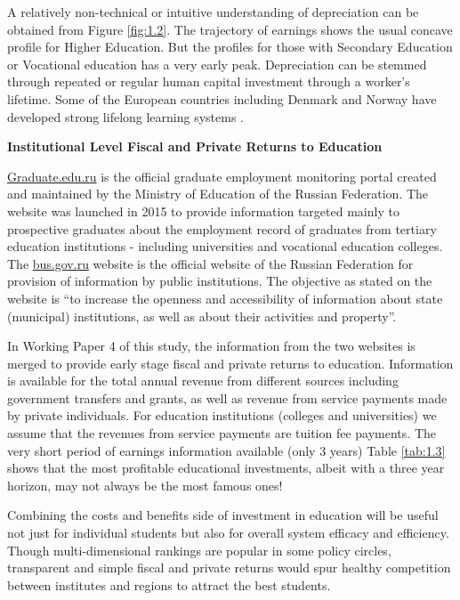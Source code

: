 \documentclass[alpha-refs]{wiley-article-04t}
\begin{document}
 A relatively non-technical or 
intuitive understanding of depreciation can be 
obtained from Figure \ref{fig:1.2}. The trajectory of earnings shows the 
usual 
concave profile for Higher Education. But the profiles for those with 
Secondary Education or Vocational education has a very early peak. 
Depreciation can be stemmed through  
repeated or regular human capital investment through a worker's lifetime. 
Some of the European countries including Denmark and Norway have developed 
strong lifelong learning systems 
\parencite{jorgensen2007,midtsundstad2019}. 

\newpage

\hspace{-2em} \textbf{Institutional Level Fiscal and Private Returns to 
Education}

\vspace{1em}

\noindent \url{Graduate.edu.ru} is the official graduate employment 
monitoring portal 
created and maintained by the Ministry of Education of the Russian 
Federation. The website was launched in 2015 to provide information 
targeted mainly to prospective graduates about the employment record of 
graduates from tertiary education institutions - including universities and 
vocational education colleges. The \url{bus.gov.ru} website is the official 
website of the Russian Federation for provision of information by public 
institutions. The objective as stated on the website is ``to increase the 
openness and accessibility of information about state (municipal) 
institutions, as well as about their activities and property''. 

In Working Paper 4 of this study, the information from the two websites is 
merged to provide early stage fiscal and private returns to education.  
Information is available for the total annual revenue from different 
sources including government transfers and grants, as well as revenue from 
service payments made by private individuals. For education institutions 
(colleges and universities) we assume that the revenues from service 
payments are tuition fee payments. The very short period of earnings 
information available (only 3 years) Table \ref{tab:1.3} shows 
that the most profitable educational investments, albeit with a three year 
horizon, may not always be the most famous ones! 


Combining the costs and benefits side of investment in education will be 
useful not just for  individual students but also for overall system 
efficacy and efficiency.  Though multi-dimensional rankings are popular in 
some policy circles, transparent and simple fiscal and private returns 
would spur healthy competition between institutes and regions to attract 
the best students. 
\end{document}
